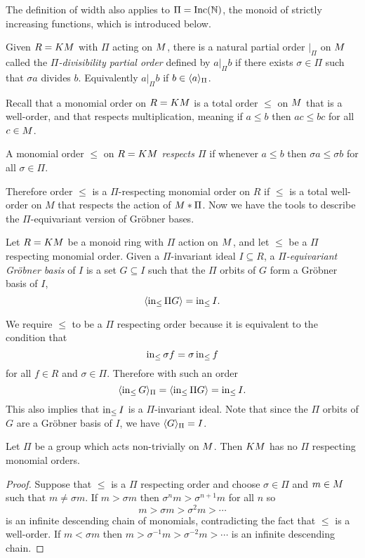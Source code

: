 The definition of width also applies to $\Pi = \operatorname{Inc}(\mathbb N)$, the monoid of strictly increasing functions, which is introduced below.
 
\begin{definition}
 Given $R = KM$ with $\Pi$ acting on $M$, there is a natural partial order $|_\Pi$ on $M$ called the {\em $\Pi$-divisibility partial order} defined by $a |_\Pi b$ if there exists $\sigma \in \Pi$ such that $\sigma a$ divides $b$.  Equivalently $a |_\Pi b$ if $b \in \langle a \rangle_\Pi$.
\end{definition}

Recall that a monomial order on $R = KM$ is a total order $\leq$ on $M$ that is a well-order, and that respects multiplication, meaning if $a \leq b$ then $ac \leq bc$ for all $c \in M$.

\begin{definition}
 A monomial order $\leq$ on $R = KM$ {\em respects $\Pi$} if whenever $a \leq b$ then $\sigma a \leq \sigma b$ for all $\sigma \in \Pi$.
\end{definition}

Therefore order $\leq$ is a $\Pi$-respecting monomial order on $R$ if $\leq$ is a total well-order on $M$ that respects the action of $M*\Pi$.
Now we have the tools to describe the $\Pi$-equivariant version of Gr\"obner bases.
\begin{definition}
 Let $R = KM$ be a monoid ring with $\Pi$ action on $M$, and let $\leq$ be a $\Pi$ respecting monomial order.  Given a $\Pi$-invariant ideal $I \subseteq R$, a {\em $\Pi$-equivariant Gr\"obner basis} of $I$ is a set $G \subseteq I$ such that the $\Pi$ orbits of $G$ form a Gr\"obner basis of $I$,
 \[ \langle \operatorname{in}_{\leq} \Pi G \rangle = \operatorname{in}_{\leq} I. \]
\end{definition}
We require $\leq$ to be a $\Pi$ respecting order because it is equivalent to the condition that
\[ \operatorname{in}_{\leq} \sigma f = \sigma \operatorname{in}_{\leq} f \]
for all $f \in R$ and $\sigma \in \Pi$.  Therefore with such an order
 \[ \langle \operatorname{in}_{\leq} G \rangle_{\Pi} = \langle \operatorname{in}_{\leq} \Pi G \rangle = \operatorname{in}_{\leq} I. \]
This also implies that $\operatorname{in}_{\leq} I$ is a $\Pi$-invariant ideal.  Note that since the $\Pi$ orbits of $G$ are a Gr\"obner basis of $I$, we have $\langle G \rangle_\Pi = I$.


\begin{proposition}\label{prop:nogroup}
 Let $\Pi$ be a group which acts non-trivially on $M$.  Then $KM$ has no $\Pi$ respecting monomial orders.
\end{proposition}
\begin{proof}
 Suppose that $\leq$ is a $\Pi$ respecting order and choose $\sigma \in \Pi$ and $m \in M$ such that $m \neq \sigma m$.  If $m > \sigma m$ then $\sigma^n m > \sigma^{n+1} m$ for all $n$ so
  \[ m > \sigma m > \sigma^2 m > \cdots \]
 is an infinite descending chain of monomials, contradicting the fact that $\leq$ is a well-order.  If $m < \sigma m$ then $m > \sigma^{-1} m > \sigma^{-2} m > \cdots$ is an infinite descending chain.
\end{proof}

